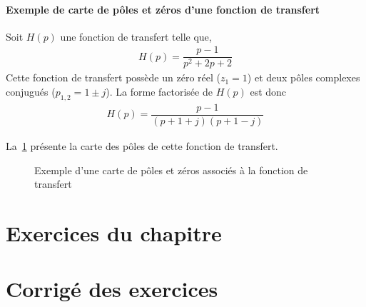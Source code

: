 \paragraph{Exemple de carte de pôles et zéros d'une fonction de transfert}

Soit $H(p)$ une fonction de transfert telle que,
\begin{align}
H(p)=\dfrac{p-1}{p^2+2p+2}\label{eq-ft_carte}
\end{align}
Cette fonction de transfert possède un zéro réel ($z_1=1$) et deux 
pôles complexes conjugués ($p_{1,2}=1\pm j$).
La forme factorisée de $H(p)$ est donc
\begin{align} 
    H(p)=\dfrac{p-1}{(p+1+j)(p+1-j)}
\end{align}

La~\cref{fig-carte} présente la carte des pôles de cette fonction de transfert.
\begin{figure}[!h]
    \begin{center}
    
\end{center}
\caption{Exemple d'une carte de pôles et zéros associés 
    à la fonction de transfert~\label{fig-carte} }
\end{figure}

\newpage
\section*{Exercices du chapitre}


\exercice{}
\question

\newpage
\section*{Corrigé des exercices}


